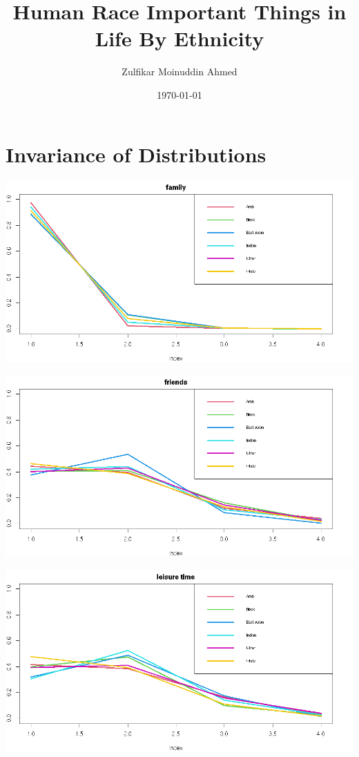 \documentclass{amsart}
\title{Human Race Important Things in Life By Ethnicity}
\author{Zulfikar Moinuddin Ahmed}
\date{\today}
\begin{document}
\maketitle

\section{Invariance of Distributions}

\includegraphics[scale=0.6]{ethfam.jpeg}

\includegraphics[scale=0.6]{ethfriends.jpeg}

\includegraphics[scale=0.6]{ethleis.jpeg}
\end{document}
